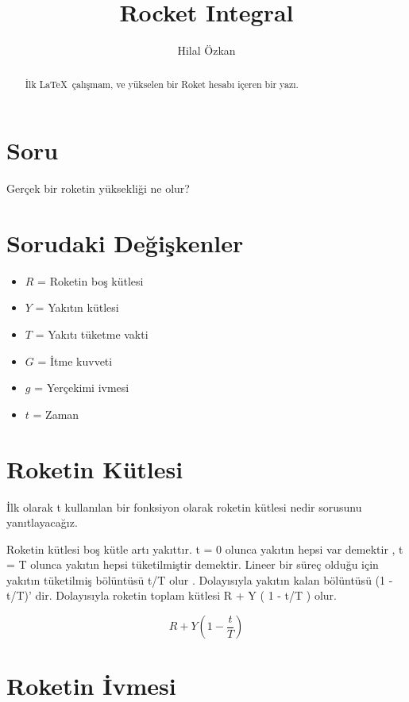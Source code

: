 \documentclass[a4paper,10pt]{article}
\title{Rocket Integral}
\author{Hilal Özkan}
\begin{document}
\maketitle

\begin{abstract}

İlk \LaTeX \, çalışmam, ve yükselen bir Roket hesabı içeren bir yazı.

\end{abstract}


 \section{Soru} 
 
 
 Gerçek bir roketin yüksekliği ne olur?

\section{Sorudaki Değişkenler}


\begin{itemize}
 \item $R$ = Roketin boş kütlesi
 \item $Y$ = Yakıtın kütlesi
 \item $T$ = Yakıtı tüketme vakti
 \item $G$ = İtme kuvveti
 \item $g$ = Yerçekimi ivmesi
 \item $t$ = Zaman
\end{itemize}

\section{Roketin Kütlesi}

  İlk olarak t kullanılan bir fonksiyon olarak roketin kütlesi nedir sorusunu yanıtlayacağız.


Roketin kütlesi boş kütle artı yakıttır. t = 0 olunca yakıtın hepsi var demektir , t  = T olunca yakıtın hepsi tüketilmiştir demektir. Lineer bir süreç olduğu için yakıtın tüketilmiş bölüntüsü t/T olur . Dolayısıyla yakıtın kalan bölüntüsü  (1 - t/T)' dir.  Dolayısıyla roketin toplam kütlesi R + Y ( 1 - t/T ) olur.

\[ R + Y ( 1 - \frac{t}{T} )\]


\section{Roketin İvmesi}
\end{document}
